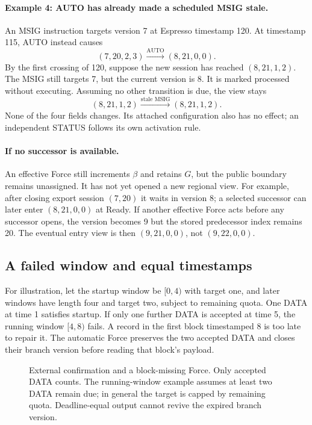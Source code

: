 \documentclass[11pt,a4paper]{article}
\begin{document}
\paragraph{Example 4: AUTO has already made a scheduled MSIG stale.}
An MSIG instruction targets version 7 at Espresso timestamp 120.
At timestamp 115, AUTO instead causes
\[
 (7,20,2,3)\xrightarrow{\text{AUTO}}(8,21,0,0).
\]
By the first crossing of 120, suppose the new session has reached
$(8,21,1,2)$. The MSIG still targets 7, but the current version is 8.
It is marked processed without executing. Assuming no other transition
is due, the view stays
\[
 (8,21,1,2)\xrightarrow{\text{stale MSIG}}(8,21,1,2).
\]
None of the four fields changes. Its attached configuration also has
no effect; an independent STATUS follows its own activation rule.

\paragraph{If no successor is available.}
An effective Force still increments $\beta$ and retains $G$, but the
public boundary remains unassigned. It has not yet opened a new regional view.
For example, after closing export session $(7,20)$ it waits in version
8; a selected successor can later enter $(8,21,0,0)$ at Ready.
If another effective Force acts before any successor opens, the version
becomes 9 but the stored predecessor index remains 20. The eventual
entry view is then $(9,21,0,0)$, not $(9,22,0,0)$.

\subsection{A failed window and equal timestamps}
\label{sec:window-example}
For illustration, let the startup window be $[0,4)$ with target one,
and later windows have length four and target two, subject to remaining
quota. One DATA at time 1 satisfies startup. If only one further DATA
is accepted at time 5, the running window $[4,8)$ fails.
A record in the first block timestamped 8 is too late to repair it.
The automatic Force preserves the two accepted DATA and closes their
branch version before reading that block's payload.

\begin{figure}[htbp]\centering

\caption{External confirmation and a block-missing Force. Only accepted
DATA counts. The running-window example assumes at least two DATA
remain due; in general the target is capped by remaining quota.
Deadline-equal output cannot revive the expired branch version.}
\label{fig:observer-finality}
\end{figure}
\FloatBarrier
\end{document}
